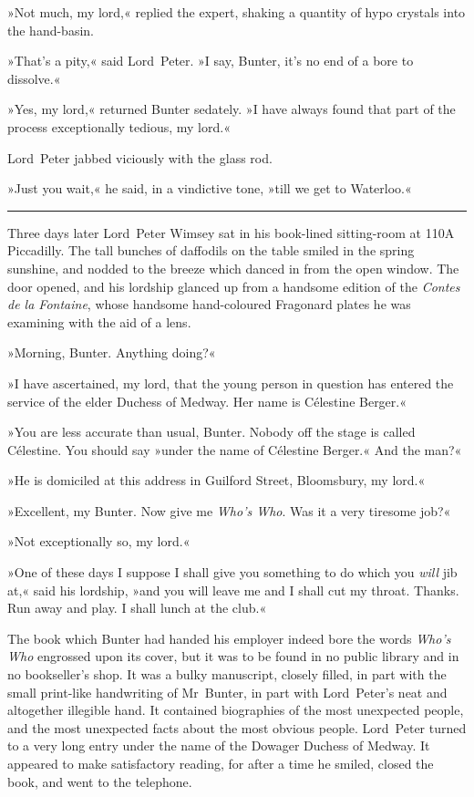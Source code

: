 »Not much, my lord,« replied the expert, shaking a quantity of hypo crystals into the hand-basin.

»That's a pity,« said Lord~Peter. »I say, Bunter, it's no end of a bore to dissolve.«

»Yes, my lord,« returned Bunter sedately. »I have always found that part of the process exceptionally tedious, my lord.«

Lord~Peter jabbed viciously with the glass rod.

»Just you wait,« he said, in a vindictive tone, »till we get to Waterloo.«

\noindent\hfil\rule{0.5\textwidth}{.4pt}\hfil 

Three days later Lord~Peter Wimsey sat in his book-lined sitting-room at 110A Piccadilly. The tall bunches of daffodils on the table smiled in the spring sunshine, and nodded to the breeze which danced in from the open window. The door opened, and his lordship glanced up from a handsome edition of the \textit{Contes de la Fontaine}, whose handsome hand-coloured Fragonard plates he was examining with the aid of a lens.

»Morning, Bunter. Anything doing?«

»I have ascertained, my lord, that the young person in question has entered the service of the elder Duchess of Medway. Her name is Célestine Berger.«

»You are less accurate than usual, Bunter. Nobody off the stage is called Célestine. You should say »under the name of Célestine Berger.« And the man?«

»He is domiciled at this address in Guilford Street, Bloomsbury, my lord.«

»Excellent, my Bunter. Now give me \textit{Who's Who}. Was it a very tiresome job?«

»Not exceptionally so, my lord.«

»One of these days I suppose I shall give you something to do which you \textit{will} jib at,« said his lordship, »and you will leave me and I shall cut my throat. Thanks. Run away and play. I shall lunch at the club.«

The book which Bunter had handed his employer indeed bore the words \textit{Who's Who} engrossed upon its cover, but it was to be found in no public library and in no bookseller's shop. It was a bulky manuscript, closely filled, in part with the small print-like handwriting of Mr~Bunter, in part with Lord~Peter's neat and altogether illegible hand. It contained biographies of the most unexpected people, and the most unexpected facts about the most obvious people. Lord~Peter turned to a very long entry under the name of the Dowager Duchess of Medway. It appeared to make satisfactory reading, for after a time he smiled, closed the book, and went to the telephone.

